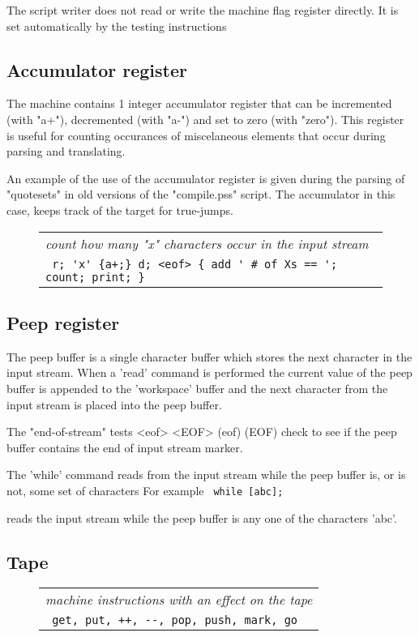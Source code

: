 \documentclass[a4paper,12pt]{article}
\begin{document}
  The script writer does not read or write the machine flag register
  directly. It is set automatically by the testing instructions

\subsection{Accumulator register}

  The machine contains 1 integer accumulator register that can
  be incremented (with "a+"), decremented (with "a-") and set to
  zero (with "zero"). This register is useful for counting occurances
  of miscelaneous elements that occur during parsing and translating.

  An example of the use of the accumulator register is given during the
  parsing of "quotesets" in old versions of the "compile.pss" script. The
  accumulator in this case, keeps track of the target for true-jumps.
 \begin{figure}
 \begin{tabular}{ l }
 \emph{ count how many "x" characters occur in the input stream } \\ 
 \verb| r; 'x' {a+;} d; <eof> { add ' # of Xs == '; count; print; } |
 \end{tabular} 
 \end{figure}
  
\subsection{Peep register}

  The peep buffer is a single character buffer which stores
  the next character in the input stream. When a 'read' command
  is performed the current value of the peep buffer is appended to
  the 'workspace' buffer and the next character from the input
  stream is placed into the peep buffer.

  The "end-of-stream" tests <eof> <EOF> (eof) (EOF) check to see if the peep
  buffer contains the end of input stream marker.

  The 'while' command reads from the input stream while the
  peep buffer is, or is not, some set of characters
  For example 
 \verb| while [abc]; |

  reads the input stream while the peep buffer is any one of the
  characters 'abc'.

\subsection{Tape}
 \begin{figure}
 \begin{tabular}{ l }
 \emph{ machine instructions with an effect on the tape } \\ 
 \verb| get, put, ++, --, pop, push, mark, go |
 \end{tabular} 
 \end{figure}
\end{document}
